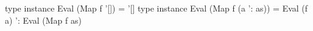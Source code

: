 \begin{code}
type instance Eval (Map f '[]) = '[]
type instance Eval (Map f (a ': as)) = Eval (f a) ': Eval (Map f as)
\end{code}
